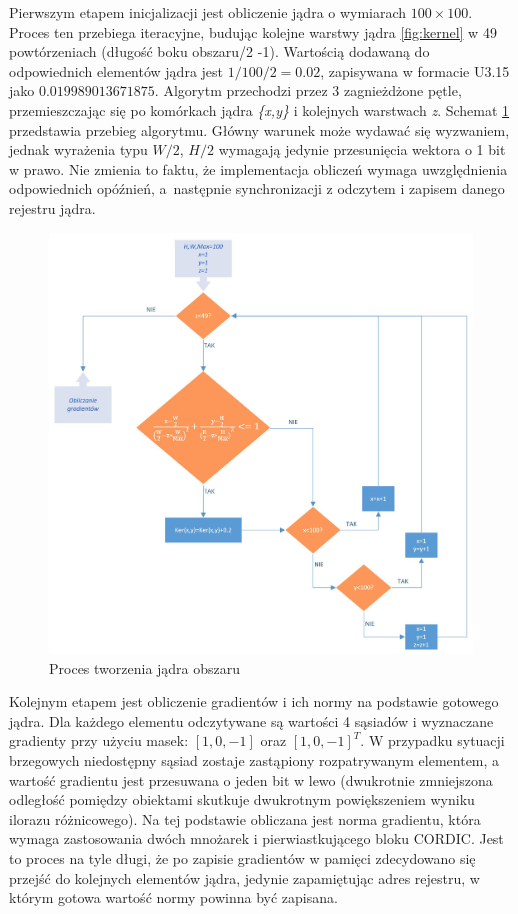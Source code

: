 Pierwszym etapem inicjalizacji jest obliczenie jądra o wymiarach $100\times 100$. 
Proces ten przebiega iteracyjne, budując kolejne warstwy jądra \ref{fig:kernel} w 49 powtórzeniach (długość boku obszaru/2 -1). %
Wartością dodawaną do odpowiednich elementów jądra jest $1/100/2=0.02$, zapisywana w formacie U3.15 jako $0.019989013671875$. 
Algorytm przechodzi przez 3 zagnieżdżone pętle, przemieszczając się po komórkach jądra \textit{\{x,y\}} i kolejnych warstwach \textit{z}. 
Schemat \ref{fig:kernel_build} przedstawia przebieg algorytmu. 
Główny warunek może wydawać się wyzwaniem, jednak wyrażenia typu $W/2$, $H/2$ wymagają jedynie przesunięcia wektora o 1 bit w prawo. 
Nie zmienia to faktu, że implementacja obliczeń wymaga uwzględnienia odpowiednich opóźnień, a~następnie synchronizacji z odczytem i zapisem danego rejestru jądra.
\begin{figure}[h]
	\centering
	\includegraphics[width=15cm]{4_kernel.jpg}
	\caption{Proces tworzenia jądra obszaru}
	\label{fig:kernel_build}
\end{figure}

Kolejnym etapem jest obliczenie gradientów i ich normy na podstawie gotowego jądra. 
Dla każdego elementu odczytywane są wartości 4 sąsiadów i wyznaczane gradienty przy użyciu masek: $[1,0,-1]$ oraz $[1,0,-1]^T$. 
W przypadku sytuacji brzegowych niedostępny sąsiad zostaje zastąpiony rozpatrywanym elementem, a wartość gradientu jest przesuwana o jeden bit w lewo (dwukrotnie zmniejszona odległość pomiędzy obiektami skutkuje dwukrotnym powiększeniem wyniku ilorazu różnicowego). 
Na tej podstawie obliczana jest norma gradientu, która wymaga zastosowania dwóch mnożarek i pierwiastkującego bloku CORDIC. 
Jest to proces na tyle długi, że po zapisie gradientów w pamięci zdecydowano się przejść do kolejnych elementów jądra, jedynie zapamiętując adres rejestru, w którym gotowa wartość normy powinna być zapisana.

